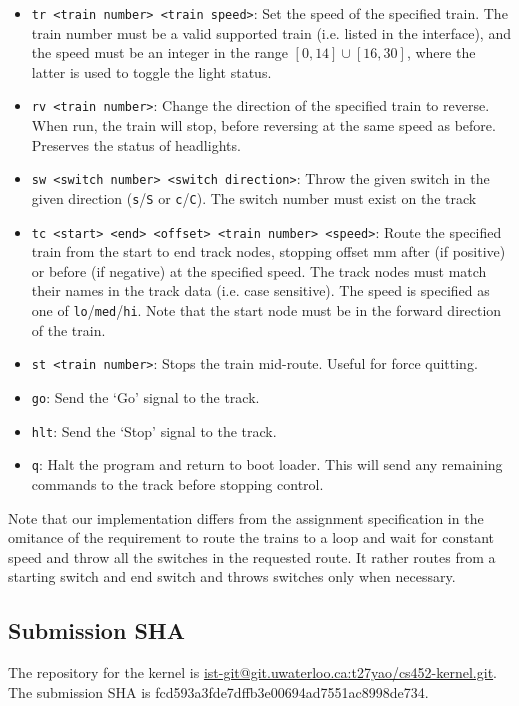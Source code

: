 \documentclass[12pt, titlepage]{article}
\begin{document}
    \begin{itemize}
        \item \verb`tr <train number> <train speed>`: Set the speed of the specified train. The train number must be a valid supported train (i.e. listed in the interface), and the speed must be an integer in the range $[0,14] \cup [16,30]$, where the latter is used to toggle the light status.
        \item \verb`rv <train number>`: Change the direction of the specified train to reverse. When run, the train will stop, before reversing at the same speed as before. Preserves the status of headlights.
        \item \verb`sw <switch number> <switch direction>`: Throw the given switch in the given direction (\verb`s`/\verb`S` or \verb`c`/\verb`C`). The switch number must exist on the track
        \item \verb`tc <start> <end> <offset> <train number> <speed>`: Route the specified train from the start to end track nodes, stopping offset mm after (if positive) or before (if negative) at the specified speed. The track nodes must match their names in the track data (i.e. case sensitive). The speed is specified as one of \verb`lo`/\verb`med`/\verb`hi`. Note that the start node must be in the forward direction of the train.
        \item \verb`st <train number>`: Stops the train mid-route. Useful for force quitting.
        \item \verb`go`: Send the `Go' signal to the track.
        \item \verb`hlt`: Send the `Stop' signal to the track.
        \item \verb`q`: Halt the program and return to boot loader. This will send any remaining commands to the track before stopping control.
    \end{itemize}

    Note that our implementation differs from the assignment specification in the omitance of the requirement to route the trains to a loop and wait for constant speed and throw all the switches in the requested route. It rather routes from a starting switch and end switch and throws switches only when necessary.

    \subsection{Submission SHA}

    The repository for the kernel is \href{https://git.uwaterloo.ca/t27yao/cs452-kernel}{ist-git@git.uwaterloo.ca:t27yao/cs452-kernel.git}. The submission SHA is fcd593a3fde7dffb3e00694ad7551ac8998de734.
\end{document}
